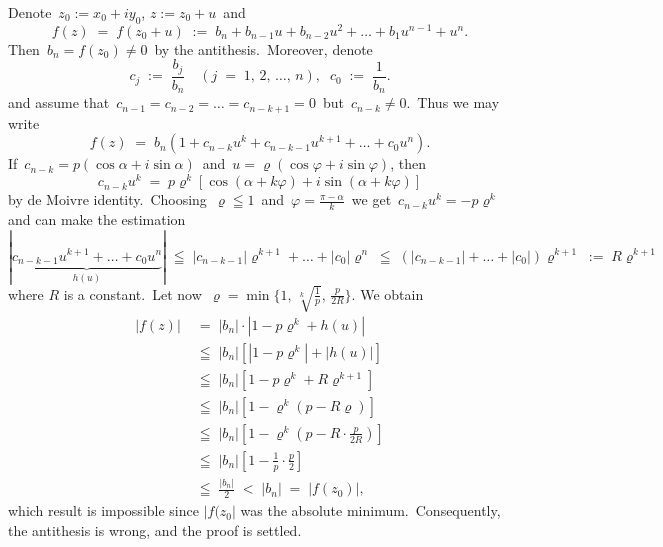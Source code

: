 \documentclass[12pt]{article}
\theoremstyle{definition}
\begin{document}
Denote\, $z_0 := x_0\!+\!iy_0$, \; $z := z_0\!+\!u$\, and
$$f(z) \;=\; f(z_0\!+\!u) \;:=\; b_n\!+\!b_{n-1}u\!+\!b_{n-2}u^2\!+\ldots+b_1u^{n-1}\!+\!u^n.$$
Then\, $b_n = f(z_0) \neq 0$\, by the antithesis.\, Moreover, denote
$$c_j \;:=\; \frac{b_j}{b_n} \quad (j \;=\; 1,\,2,\,\ldots,\,n), \;\; c_0 \;:=\; \frac{1}{b_n}.$$
and assume that\, $c_{n-1} = c_{n-2} = \ldots = c_{n-k+1} = 0$\, but\, $c_{n-k} \neq 0.$\, Thus we may write
$$f(z) \;=\; b_n(1\!+\!c_{n-k}u^k\!+\!c_{n-k-1}u^{k+1}\!+\ldots\!+\!c_0u^n).$$
If\, $c_{n-k} = p(\cos\alpha+i\sin\alpha)$\, and\, $u = \varrho(\cos\varphi+i\sin\varphi)$, then 
$$c_{n-k}u^k \;=\; p\varrho^k[\cos(\alpha\!+\!k\varphi)+i\sin(\alpha\!+\!k\varphi)]$$
by de Moivre identity.\, Choosing\, $\varrho \leqq 1$\, and\, $\varphi = \frac{\pi\!-\!\alpha}{k}$\, we get\, 
$c_{n-k}u^k = -p\varrho^k$\, and can make the estimation
$$|\underbrace{c_{n-k-1}u^{k+1}\!+\ldots+\!c_0u^n}_{h(u)}| 
\;\leqq\; |c_{n-k-1}|\varrho^{k+1}\!+\ldots+\!|c_0|\varrho^n 
\;\leqq\; (|c_{n-k-1}|\!+\ldots+\!|c_0|)\varrho^{k+1} \;:=\; R\varrho^{k+1}$$
where $R$ is a constant.\, Let now\, $\varrho = \min\{1,\,\sqrt[k]{\frac{1}{p}},\,\frac{p}{2R}\}$.\; We obtain
\begin{align*}
|f(z)| &\;=\; |b_n|\!\cdot\!|1\!-\!p\varrho^k+h(u)|\\
       &\;\leqq\; |b_n|\left[|1\!-\!p\varrho^k|+|h(u)|\right]\\
       &\;\leqq\; |b_n|\left[1\!-\!p\varrho^k\!+\!R\varrho^{k+1}\right]\\  
       &\;\leqq\; |b_n|\left[1\!-\!\varrho^k(p\!-\!R\varrho)\right]\\  
       &\;\leqq\; |b_n|\left[1\!-\!\varrho^k(p\!-\!R\cdot\frac{p}{2R})\right]\\
       &\;\leqq\; |b_n|\left[1\!-\!\frac{1}{p}\!\cdot\!\frac{p}{2}\right]\\
       &\;\leqq\; \frac{|b_n|}{2} \;<\; |b_n| \;=\; |f(z_0)|,
\end{align*}
which result is impossible since $|f(z_0|$ was the absolute minimum.\, Consequently, the antithesis is wrong, and the proof is settled.

\end{document}
